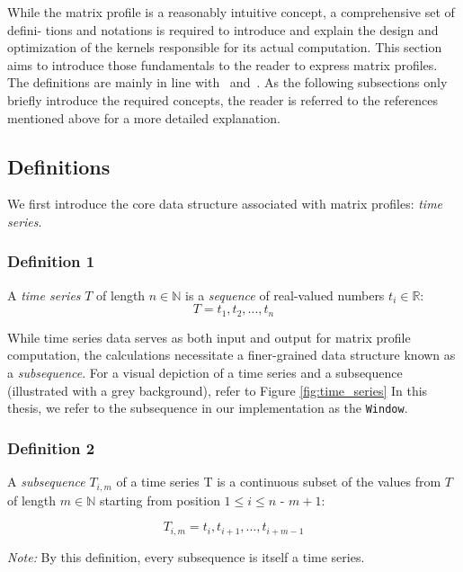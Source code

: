 While the matrix profile is a reasonably intuitive concept, a comprehensive set of defini-
tions and notations is required to introduce and explain the design and optimization of
the kernels responsible for its actual computation. This section aims to introduce those
fundamentals to the reader to express matrix profiles. The definitions are mainly in line
with~\cite{1} and~\cite{2}. As the following subsections only briefly introduce the required
concepts, the reader is referred to the references mentioned above for a more detailed
explanation.

\subsection{Definitions} \label{subsection:definitions}

We first introduce the core data structure associated with matrix profiles: \textit{time series}.\\

\subsubsection{Definition 1} A \textit{time series} \(T\) of length \( \textit{n} \in \mathbb{N} \) is a \textit{sequence} of real-valued numbers \( \textit{t}_{i} \in \mathbb{R}\):
\[ T = \textit{t}_{1},\textit{t}_{2},\dots,\textit{t}_{n} \]

While time series data serves as both input and output for matrix profile computation, the calculations necessitate a finer-grained data structure known as a \textit{subsequence}. For a visual depiction of a time series and a subsequence (illustrated with a grey background), refer to Figure \ref{fig:time_series} In this thesis, we refer to the subsequence in our implementation as the \texttt{Window}.

\subsubsection{Definition 2} A \textit{subsequence} \(T_{i,m}\) of a time series T is a continuous subset of the values from \(T\) of length \( \textit{m} \in \mathbb{N} \) starting from position \( 1 \le \textit{i} \le \textit{n - m} + 1 \):

\[ T_{i,m} = \textit{t}_{i},\textit{t}_{i+1},\dots,\textit{t}_{i + m - 1} \]

\textit{Note:} By this definition, every subsequence is itself a time series.

